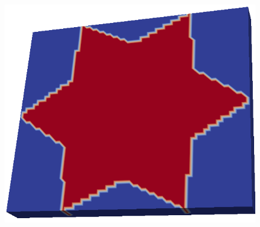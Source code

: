 \begin{frame}
\begin{minipage}{0.85\textwidth}
\begin{figure}
			\includegraphics[scale=0.1706]{Pictures/STLToVoxels/Star_VTK_Trans.png}
			\end{figure}
		\end{minipage}
		\begin{minipage}{0.14\textwidth}
			\begin{figure}
				\\

\end{figure}
\end{minipage}
\end{frame}
